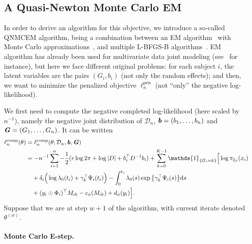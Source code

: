 \documentclass[11pt]{article}
\newcommand{\dd}{\mathrm{d}}
\newcommand{\ind}[1]{\mathds{1}_{#1}}
\newcommand{\cD}{\mathcal D}
\begin{document}
\subsection{A Quasi-Newton Monte Carlo EM}
\label{sec:QNMCEM}

In order to derive an algorithm for this objective, we introduce a so-called QNMCEM algorithm, being a combination
between an EM algorithm~\citep{dempster1977maximum} with Monte Carlo approximations~\citep{levine2001implementations}, and multiple L-BFGS-B algorithms~\citep{zhu1997algorithm}. EM algorithm has already been used for multivariate data joint modeling (see~\citet{lin2002maximum} for instance), but here we face different original problems: for each subject $i$, the latent variables are the pairs $(G_i, b_i)$ (not only the random effects); and then, we want to minimize the penalized objective $\ell_n^\text{pen}$ (not ``only'' the negative log-likelihood).

We first need to compute the negative completed log-likelihood (here scaled by $n^{-1}$), namely the negative joint distribution of $\cD_n$, $\textbf{\textit{b}} = (b_1, \ldots, b_n)$ and $\textbf{\textit{G}} = (G_1, \ldots, G_n)$.
It can be written
\begin{align*}
  \ell_n^\text{comp}(\theta) &= \ell_n^\text{comp}(\theta ; \cD_n, \textbf{\textit{b}}, \textbf{\textit{G}}) \\ 
  &= - n^{-1} \sum_{i=1}^n -\dfrac12 (r \log 2\pi + \log|D| + b_i^\top D^{-1}b_i) + \sum_{k=0}^{K-1} \ind{\{G_i=k\}} \Big[ \log \pi_{\xi_k}(x_i) \\ 
  & \quad + \delta_i \Big(\log \lambda_0(t_i) + \gamma_k^\top \Psi_i(t_i) \Big) - \int_0^{t_i} \lambda_0(s) \exp \big\{ \gamma_k^\top \Psi_i(s) \big\} \dd s \\
  & \quad + (y_i \odot \Phi_i)^\top M_{ik} - c_\phi(M_{ik}) + d_\phi(y_i) \Big].
\end{align*}
Suppose that we are at step $w + 1$ of the algorithm, with current iterate denoted $\theta^{(w)}$. 

\paragraph*{Monte Carlo E-step.}
\end{document}

